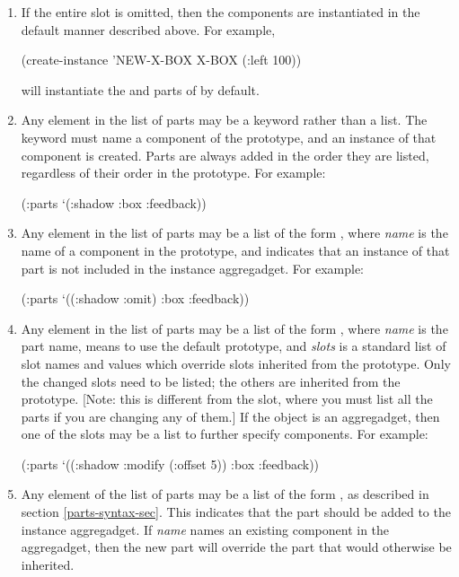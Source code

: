 \begin{enumerate}
\item If the entire  slot is omitted, then the components are
instantiated in the default manner described above.  For example,
\begin{programexample}
(create-instance 'NEW-X-BOX X-BOX (:left 100))
\end{programexample}
will instantiate the  and  parts of 
by default.

\item Any element in the list of parts may be a keyword rather than a list.
The keyword must name a component of the prototype, and an instance
of that component is created.  Parts are always added in the order
they are listed, regardless of their order in the prototype.
For example:
\begin{programexample}
(:parts `(:shadow :box :feedback))
\end{programexample}

\item {}
Any element in the list of parts may be a list of the form
, where {\it name} is the name of a component
in the prototype, and  indicates that an instance of that
part is not included in the instance aggregadget.  For example:
\begin{programexample}
(:parts `((:shadow :omit)
	  :box
	  :feedback))
\end{programexample}

\item {}
Any element in the list of parts may be a list of the form
, where {\it name} is the part name,
 means to use the default prototype, and {\it slots} is a
standard list of slot names and values which override slots inherited
from the prototype.  Only the changed slots
need to be listed; the others are inherited from the prototype.  [Note:
this is different from the  slot, where you must list all the
parts if you are changing any of them.]
If the object is an aggregadget, then one of the
slots may be a  list to further specify components.
For example:
\begin{programexample}
(:parts `((:shadow :modify (:offset 5))
	  :box
	  :feedback))
\end{programexample}

\item Any element of the list of parts may be a list of the form
, as described in section
\ref{parts-syntax-sec}.  This indicates that the part should be added
to the instance aggregadget.
If {\it name} names an existing component in the aggregadget, then
the new part will override the part that would otherwise be inherited.
\end{enumerate}


